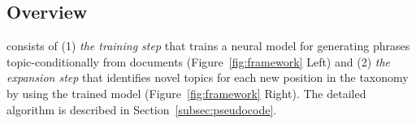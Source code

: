 
\subsection{Overview}
\label{subsec:overview}
\proposed consists of (1) \textit{the training step} that trains a neural model for generating phrases topic-conditionally from documents (Figure~\ref{fig:framework} Left)
and (2) \textit{the expansion step} that identifies novel topics for each new position in the taxonomy by using the trained model (Figure~\ref{fig:framework} Right).
The detailed algorithm is described in Section~\ref{subsec:pseudocode}.


